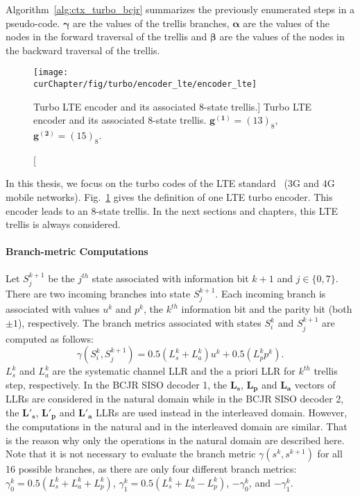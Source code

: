 Algorithm~\ref{alg:ctx_turbo_bcjr} summarizes the previously enumerated steps in
a pseudo-code. $\bm{\gamma}$ are the values of the trellis branches,
$\bm{\alpha}$ are the values of the nodes in the forward traversal of the
trellis and $\bm{\beta}$ are the values of the nodes in the backward traversal
of the trellis.

\begin{figure}[htp]
  \centering
  \texttt{[image: \\curChapter/fig/turbo/encoder\_lte/encoder\_lte]}
  \caption
    [Turbo LTE encoder and its associated 8-state trellis.]
    {Turbo LTE encoder and its associated 8-state trellis.
     $\bm{g^{(1)}} = (13)_8$, $\bm{g^{(2)}} = (15)_8$.}
  \label{fig:ctx_turbo_encoder_lte}
\end{figure}

In this thesis, we focus on the turbo codes of the LTE standard~\cite{ETSI2013}
(3G and 4G mobile networks). Fig.~\ref{fig:ctx_turbo_encoder_lte} gives the
definition of one LTE turbo encoder. This encoder leads to an 8-state trellis.
In the next sections and chapters, this LTE trellis is always considered.

\paragraph{Branch-metric Computations}

Let $S_j^{k+1}$ be the $j^{th}$ state associated with information bit $k+1$ and
$j \in \{0,7\}$. There are two incoming branches into state $S_j^{k+1}$. Each
incoming branch is associated with values $u^k$ and $p^k$, the $k^{th}$
information bit and the parity bit (both $\pm1$), respectively. The branch
metrics associated with states $S_i^k$ and $S_j^{k+1}$ are computed as follows:
\begin{equation}
\label{eq:ctx_turbo_gamma}
 \gamma(S_i^k, S_j^{k+1}) = 0.5(L_{s}^k + L_a^k)u^k + 0.5(L_p^k p^k).
\end{equation}
$L_{s}^k$ and $L_a^k$ are the systematic channel LLR and the a priori LLR for
$k^{th}$ trellis step, respectively. In the BCJR SISO decoder 1, the
$\bm{L_{s}}$, $\bm{L_{p}}$ and $\bm{L_{a}}$ vectors of LLRs are considered
in the natural domain while in the BCJR SISO decoder 2, the $\bm{L'_{s}}$,
$\bm{L'_{p}}$ and $\bm{L'_{a}}$ LLRs are used instead in the interleaved domain.
However, the computations in the natural and in the interleaved domain are
similar. That is the reason why only the operations in the natural domain are
described here. Note that it is not necessary to evaluate the branch metric
$\gamma(s^k , s^{k+1})$ for all 16 possible branches, as there are only four
different branch metrics: $\gamma^k_0 = 0.5(L_{s}^k + L_a^k + L_p^k)$,
$\gamma^k_1 = 0.5(L_{s}^k + L_a^k - L_p^k)$, $-\gamma^k_0$, and $-\gamma^k_1$.

